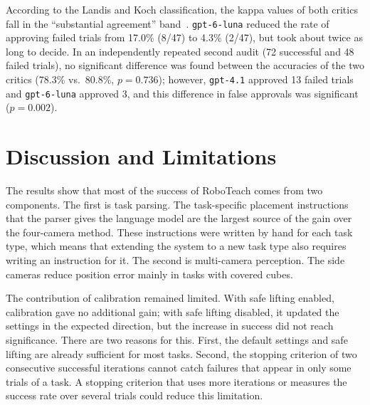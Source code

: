 \documentclass[preprint,12pt]{elsarticle}
\begin{document}
According to the Landis and Koch classification, the kappa values of both critics fall in the ``substantial agreement'' band~\cite{landis1977kappa}. \texttt{gpt-6-luna} reduced the rate of approving failed trials from 17.0\% (8/47) to 4.3\% (2/47), but took about twice as long to decide. In an independently repeated second audit (72 successful and 48 failed trials), no significant difference was found between the accuracies of the two critics (78.3\% vs.\ 80.8\%, $p = 0.736$); however, \texttt{gpt-4.1} approved 13 failed trials and \texttt{gpt-6-luna} approved 3, and this difference in false approvals was significant ($p = 0.002$).

\section{Discussion and Limitations}

The results show that most of the success of RoboTeach comes from two components. The first is task parsing. The task-specific placement instructions that the parser gives the language model are the largest source of the gain over the four-camera method. These instructions were written by hand for each task type, which means that extending the system to a new task type also requires writing an instruction for it. The second is multi-camera perception. The side cameras reduce position error mainly in tasks with covered cubes.

The contribution of calibration remained limited. With safe lifting enabled, calibration gave no additional gain; with safe lifting disabled, it updated the settings in the expected direction, but the increase in success did not reach significance. There are two reasons for this. First, the default settings and safe lifting are already sufficient for most tasks. Second, the stopping criterion of two consecutive successful iterations cannot catch failures that appear in only some trials of a task. A stopping criterion that uses more iterations or measures the success rate over several trials could reduce this limitation.
\end{document}
